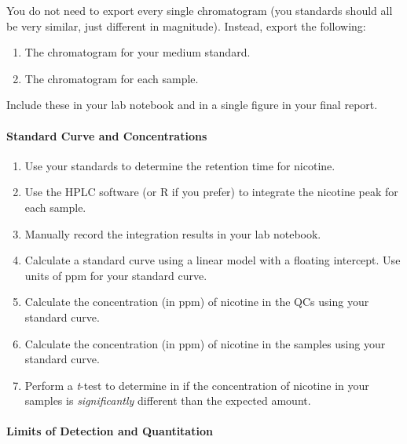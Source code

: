 \documentclass[]{tufte-book}
\providecommand{\tightlist}{%
  \setlength{\itemsep}{0pt}\setlength{\parskip}{0pt}}
\begin{document}
You do not need to export every single chromatogram (you standards should all be very similar, just different in magnitude). Instead, export the following:

\begin{enumerate}
\def\labelenumi{\arabic{enumi}.}
\tightlist
\item
  The chromatogram for your medium standard.
\item
  The chromatogram for each sample.
\end{enumerate}

Include these in your lab notebook and in a single figure in your final report.

\hypertarget{standard-curve-and-concentrations}{%
\paragraph{\texorpdfstring{\textbf{Standard Curve and Concentrations}}{Standard Curve and Concentrations}}\label{standard-curve-and-concentrations}}

\begin{enumerate}
\def\labelenumi{\arabic{enumi}.}
\tightlist
\item
  Use your standards to determine the retention time for nicotine.
\item
  Use the HPLC software (or R if you prefer) to integrate the nicotine peak for each sample.
\item
  Manually record the integration results in your lab notebook.
\item
  Calculate a standard curve using a linear model with a floating intercept. Use units of ppm for your standard curve.
\item
  Calculate the concentration (in ppm) of nicotine in the QCs using your standard curve.
\item
  Calculate the concentration (in ppm) of nicotine in the samples using your standard curve.
\item
  Perform a \emph{t}-test to determine in if the concentration of nicotine in your samples is \emph{significantly} different than the expected amount.
\end{enumerate}

\hypertarget{limits-of-detection-and-quantitation}{%
\paragraph{\texorpdfstring{\textbf{Limits of Detection and Quantitation}}{Limits of Detection and Quantitation}}\label{limits-of-detection-and-quantitation}}
\end{document}
